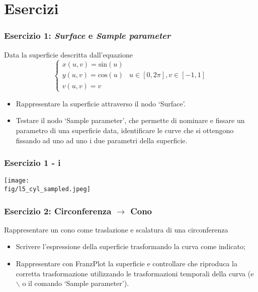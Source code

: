 \documentclass{beamer}
\newcommand{\fig}{./figures} %
\newcommand{\msin}{\mbox{sin}} %
\newcommand{\mcos}{\mbox{cos}} %
\newcommand{\frnzplt}{FranzPlot }
\begin{document}
\section{Esercizi}
\begin{frame}
\frametitle{Esercizio 1: \textit{Surface} e \textit{Sample parameter}}
Data la superficie descritta dall'equazione
\begin{displaymath}
\begin{cases}
x(u,v) = \msin(u)\\
y(u,v) = \mcos(u) & u\in [0,2\pi], v \in[-1,1]\\
v(u,v) = v
\end{cases}
\end{displaymath}
\begin{itemize}
\item Rappresentare la superficie attraverso il nodo `Surface'.
\item Testare il  nodo `Sample parameter', che permette di nominare e
fissare un parametro di una superficie data, identificare le curve che si
ottengono fissando ad uno ad uno i  due parametri della superficie.  
\end{itemize}
\end{frame}
%
\begin{frame}
\frametitle{Esercizio 1 - i}
\begin{center}
\texttt{[image: \\fig/l5\_cyl\_sampled.jpeg]}
\end{center}
\end{frame}
%
\begin{frame}
\frametitle{Esercizio 2: Circonferenza $\rightarrow$ Cono}

Rappresentare un cono come traslazione e scalatura di una circonferenza

\begin{itemize}
\item Scrivere l'espressione della superficie trasformando la curva come indicato;
\item Rappresentare con \frnzplt la superficie e controllare che riproduca la
corretta trasformazione utilizzando le trasformazioni temporali della curva
(e$\backslash$ o il comando `Sample parameter').
\end{itemize}
\end{frame}
%
\end{document}

